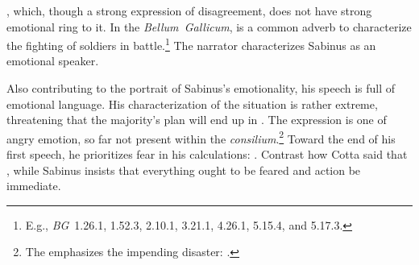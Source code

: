 \documentclass[12pt,letterpaper,oneside,final]{memoir}
\begin{document}
, which, though a strong expression of disagreement, does not have strong emotional ring to it. In the \emph{Bellum~Gallicum},  is a common adverb to characterize the fighting of soldiers in battle.\footnote{E.g., \emph{BG}~1.26.1, 1.52.3, 2.10.1, 3.21.1, 4.26.1, 5.15.4, and 5.17.3.} The narrator characterizes Sabinus as an emotional speaker.

Also contributing to the portrait of Sabinus's emotionality, his speech is full of emotional language. His characterization of the situation is rather extreme, threatening that the majority's plan will end up in . The expression is one of angry emotion, so far not present within the \emph{consilium}.\footnote{The  emphasizes the impending disaster: .} Toward the end of his first speech, he prioritizes fear in his calculations: . Contrast how Cotta said that , while Sabinus insists that everything ought to be feared and action be immediate. %
\end{document}

